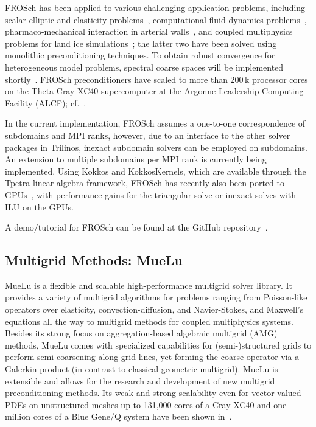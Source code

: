 FROSch has been applied to various challenging application problems, including scalar elliptic and elasticity problems~\cite{heinlein_parallel_2016}, computational fluid dynamics problems~\cite{heinlein_monolithic_2019}, pharmaco-mechanical interaction in arterial walls~\cite{balzani_computational_nodate}, and coupled multiphysics problems for land ice simulations~\cite{heinlein_frosch_2022}; the latter two have been solved using monolithic preconditioning techniques. To obtain robust convergence for heterogeneous model problems, spectral coarse spaces will be implemented shortly~\cite{heinlein_adaptive_2019}. FROSch preconditioners have scaled to more than 200\,k processor cores on the Theta Cray XC40 supercomputer at the Argonne Leadership Computing Facility (ALCF); cf.~\cite{heinlein_parallel_2022}.

In the current implementation, FROSch assumes a one-to-one correspondence of subdomains and MPI ranks, however, due to an interface to the other solver packages in Trilinos, inexact subdomain solvers can be employed on subdomains. An extension to multiple subdomains per MPI rank is currently being implemented. Using Kokkos and KokkosKernels, which are available through the Tpetra linear algebra framework, FROSch has recently also been ported to GPUs~\cite{Yamazaki:2022:EST}, with performance gains for the triangular solve or inexact solves with ILU on the GPUs.

A demo/tutorial for FROSch can be found at the GitHub repository~\cite{frosch_demo}.

\subsection{Multigrid Methods: MueLu}

MueLu is a flexible and scalable high-performance multigrid solver library.
It provides a variety of multigrid algorithms for problems ranging from Poisson-like operators over elasticity, convection-diffusion, and Navier-Stokes, and Maxwell’s equations
all the way to multigrid methods for coupled multiphysics systems.
Besides its strong focus on aggregation-based algebraic multigrid (AMG) methods,
MueLu comes with specialized capabilities for (semi-)structured grids to perform semi-coarsening along grid lines,
yet forming the coarse operator via a Galerkin product (in contrast to classical geometric multigrid).
MueLu is extensible and allows for the research and development of new multigrid preconditioning methods.
Its weak and strong scalability even for vector-valued PDEs on unstructured meshes
up to 131,000 cores of a Cray XC40 and one million cores of a Blue Gene/Q system have been shown in~\cite{Lin2017a,Thomas2019a}.

